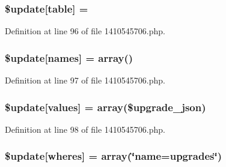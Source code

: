 \subsubsection[{\texorpdfstring{\$update}{$update}}]{\setlength{\rightskip}{0pt plus 5cm}\${\bf update}\mbox{[}\textquotesingle{}table\textquotesingle{}\mbox{]} = \textquotesingle{}}\hypertarget{1410545706_8php_aee7ba5985ddf023a93862ab77e9718f9}{}\label{1410545706_8php_aee7ba5985ddf023a93862ab77e9718f9}


Definition at line 96 of file 1410545706.\+php.

\subsubsection[{\texorpdfstring{\$update}{$update}}]{\setlength{\rightskip}{0pt plus 5cm}\${\bf update}\mbox{[}\textquotesingle{}names\textquotesingle{}\mbox{]} = array(\textquotesingle{})}\hypertarget{1410545706_8php_abcf5ad2e4fef35de04bef0168cc91ddc}{}\label{1410545706_8php_abcf5ad2e4fef35de04bef0168cc91ddc}


Definition at line 97 of file 1410545706.\+php.

\subsubsection[{\texorpdfstring{\$update}{$update}}]{\setlength{\rightskip}{0pt plus 5cm}\${\bf update}\mbox{[}\textquotesingle{}values\textquotesingle{}\mbox{]} = array(\$upgrade\+\_\+json)}\hypertarget{1410545706_8php_ac82a75b4c6df37380ff77c88f041785e}{}\label{1410545706_8php_ac82a75b4c6df37380ff77c88f041785e}


Definition at line 98 of file 1410545706.\+php.

\subsubsection[{\texorpdfstring{\$update}{$update}}]{\setlength{\rightskip}{0pt plus 5cm}\${\bf update}\mbox{[}\textquotesingle{}wheres\textquotesingle{}\mbox{]} = array(\char`\"{}name=\textquotesingle{}upgrades\textquotesingle{}\char`\"{})}\hypertarget{1410545706_8php_aacde4479a904b32d0f24dea4e01f148c}{}\label{1410545706_8php_aacde4479a904b32d0f24dea4e01f148c}



